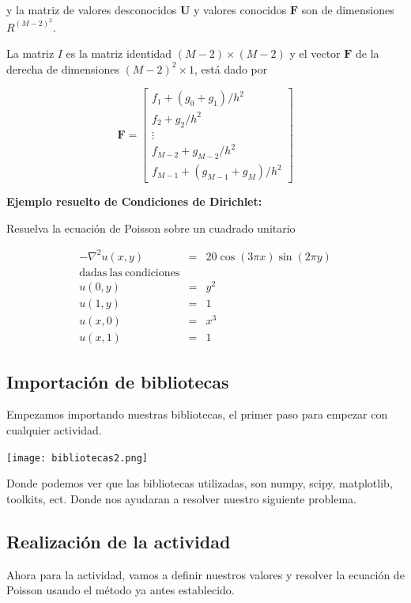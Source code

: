 \documentclass[12pt]{article}
\begin{document}
y la matriz de valores desconocidos $\mathbf{U}$ y valores conocidos $\mathbf{F}$ son de dimensiones $R^{(M-2)^2}$.

La matriz $I$ es la matriz identidad $(M-2) \times (M-2)$ y el vector $\mathbf{F}$ de la derecha de dimensiones $(M-2)^2 \times 1$, está dado por

\begin{equation*}
\mathbf{F} = \begin{bmatrix}
f_1 + (g_0+g_1)/h^2 \\
f_2 + g_2/h^2 \\ \vdots \\
f_{M-2} + g_{M-2}/h^2 \\
f_{M-1} + (g_{M-1} + g_M)/h^2
\end{bmatrix}
\end{equation*}

\textbf{Ejemplo resuelto de Condiciones de Dirichlet:}

Resuelva la ecuación de Poisson sobre un cuadrado unitario 

\begin{eqnarray*}
- \nabla^2 u(x,y) & = & 20 \cos(3\pi x) \sin(2\pi y) \\
 \mathrm{dadas \ las \ condiciones}& &  \\ 
u(0,y) & = & y^2 \\
u(1,y) & = & 1 \\
u(x,0) & = & x^3 \\
u(x,1) & = & 1
\end{eqnarray*}





\subsection{Importación de bibliotecas}
Empezamos importando nuestras bibliotecas, el primer paso para empezar con cualquier actividad.

\begin{center}
    \texttt{[image: bibliotecas2.png]}
\end{center}
 
 Donde podemos ver que las bibliotecas utilizadas, son numpy, scipy, matplotlib, toolkits, ect. Donde nos ayudaran a resolver nuestro siguiente problema.




\subsection{Realización de la actividad}
Ahora para la actividad, vamos a definir nuestros valores y resolver la ecuación de Poisson usando el método ya antes establecido.
\end{document}

